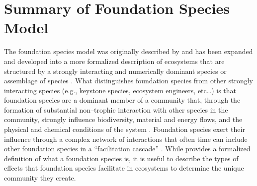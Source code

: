 \documentclass{article}
\begin{document}

\section*{Summary of Foundation Species Model}
\label{sec:found_sp_summary}

The foundation species model was originally described by  and has been expanded and developed into a more formalized description of ecosystems that are structured by a strongly interacting and numerically dominant species or assemblage of species \cite{ellison_foundation_2019}. What distinguishes foundation species from other strongly interacting species (e.g., keystone species, ecosystem engineers, etc\ldots) is that foundation species are a dominant member of a community that, through the formation of substantial non--trophic interaction with other species in the community, strongly influence biodiversity, material and energy flows, and the physical and chemical conditions of the system \cite{ellison_foundation_2019}. Foundation species exert their influence through a complex network of interactions that often time can include other foundation species in a ``facilitation cascade'' \cite{angelini_interactions_2011, ellison_foundation_2019, vozzo_cooccuring_2019}. While  provides a formalized definition of what a foundation species is, it is useful to describe the types of effects that foundation species facilitate in ecosystems to determine the unique community they create. 
\end{document}
